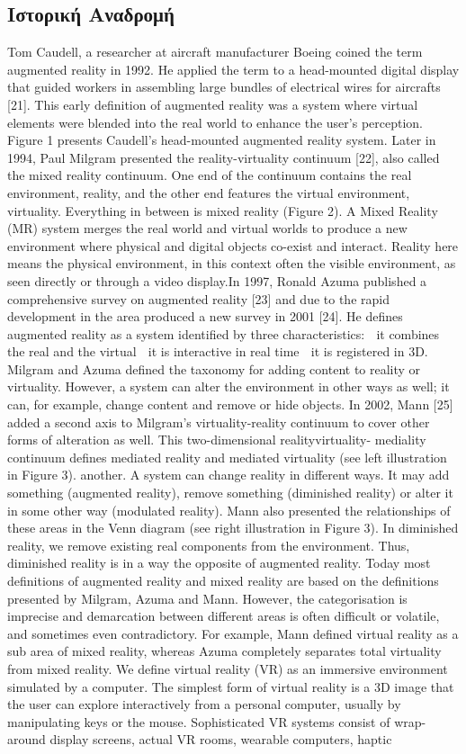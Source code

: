 \subsection{Ιστορική Αναδρομή}
Tom Caudell, a researcher at aircraft manufacturer Boeing coined the term augmented reality in 1992. He applied the term to a head-mounted digital display that guided workers in assembling large bundles of electrical wires for aircrafts [21]. This early definition of augmented reality was a system where virtual elements were blended into the real world to enhance the user’s perception. Figure 1 presents Caudell’s head-mounted augmented reality system. Later in 1994, Paul Milgram presented the reality-virtuality continuum [22], also called the mixed reality continuum. One end of the continuum contains the real environment, reality, and the other end features the virtual environment, virtuality. Everything in between is mixed reality (Figure 2). A Mixed Reality (MR) system merges the real world and virtual worlds to produce a new environment where physical and digital objects co-exist and interact. Reality here means the physical environment, in this context often the visible environment, as seen directly or through a video display.In 1997, Ronald Azuma published a comprehensive survey on augmented reality [23] and due to the rapid development in the area produced a new survey in 2001 [24]. He defines augmented reality as a system identified by three characteristics: 􀁸 it combines the real and the virtual 􀁸 it is interactive in real time 􀁸 it is registered in 3D. Milgram and Azuma defined the taxonomy for adding content to reality or virtuality. However, a system can alter the environment in other ways as well; it can, for example, change content and remove or hide objects. In 2002, Mann [25] added a second axis to Milgram’s virtuality-reality continuum to cover other forms of alteration as well. This two-dimensional realityvirtuality- mediality continuum defines mediated reality and mediated virtuality (see left illustration in Figure 3). another. A system can change reality in different ways. It may add something (augmented reality), remove something (diminished reality) or alter it in some other way (modulated reality). Mann also presented the relationships of these areas in the Venn diagram (see right illustration in Figure 3). In diminished reality, we remove existing real components from the environment. Thus, diminished reality is in a way the opposite of augmented reality. Today most definitions of augmented reality and mixed reality are based on the definitions presented by Milgram, Azuma and Mann. However, the categorisation is imprecise and demarcation between different areas is often difficult or volatile, and sometimes even contradictory. For example, Mann defined virtual reality as a sub area of mixed reality, whereas Azuma completely separates total virtuality from mixed reality. We define virtual reality (VR) as an immersive environment simulated by a computer. The simplest form of virtual reality is a 3D image that the user can explore interactively from a personal computer, usually by manipulating keys or the mouse. Sophisticated VR systems consist of wrap-around display screens, actual VR rooms, wearable computers, haptic 